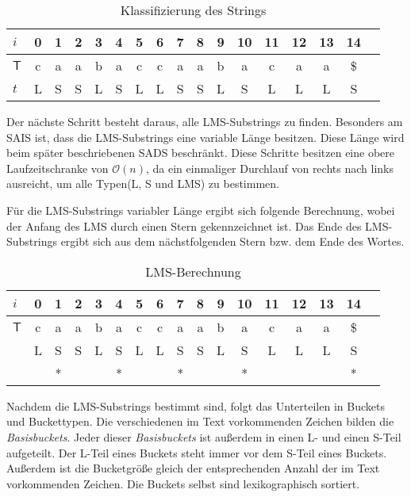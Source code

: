 \begin{table}[H]
\centering
  \begin{tabular}{ | l | c | c | c | c | c | c | c | c | c | c | c | c | c | c | c | c | }
    \hline
        $i$ & 0 & 1 & 2 & 3 & 4 & 5 & 6 & 7 & 8 & 9 & 10 & 11 & 12 & 13 & 14 \\ \hline
        $\mathsf{T}$ & c & a & a & b & a & c & c & a & a & b & a & c & a & a & \$ \\ \hline
        $t$ & L & S & S & L & S & L & L & S & S & L & S & L & L & L & S \\
    \hline
  \end{tabular}
  \caption{Klassifizierung des Strings }
\end{table}
\bigskip
\noindent Der nächste Schritt besteht daraus, alle LMS-Substrings zu finden. Besonders am SAIS ist, dass die LMS-Substrings eine variable Länge besitzen. Diese Länge wird beim später beschriebenen SADS beschränkt. Diese Schritte besitzen eine obere Laufzeitschranke von $\mathcal{O}(n)$, da ein einmaliger Durchlauf von rechts nach links ausreicht, um alle Typen(L, S und LMS) zu bestimmen.

\noindent Für die LMS-Substrings variabler Länge ergibt sich folgende Berechnung, wobei der Anfang des LMS durch einen Stern gekennzeichnet ist. Das Ende des LMS-Substrings ergibt sich aus dem nächstfolgenden Stern bzw. dem Ende des Wortes.

\begin{table}[H]
\centering
  \begin{tabular}{ | l | c | c | c | c | c | c | c | c | c | c | c | c | c | c | c | c | }
    \hline
        $i$ & 0 & 1 & 2 & 3 & 4 & 5 & 6 & 7 & 8 & 9 & 10 & 11 & 12 & 13 & 14 \\ \hline
        $\mathsf{T}$ & c & a & a & b & a & c & c & a & a & b & a & c & a & a & \$ \\ \hline
            & L & S & S & L & S & L & L & S & S & L & S & L & L & L & S \\ \hline
            &   & * &   &   & * &   &   & * &   &   & * &   &   &   & * \\
    \hline
  \end{tabular}
  \caption{LMS-Berechnung}
\end{table}
\bigskip
\noindent Nachdem die LMS-Substrings bestimmt sind, folgt das Unterteilen in Buckets und Buckettypen. Die verschiedenen im Text vorkommenden Zeichen bilden die  \textit{Basisbuckets}. Jeder dieser  \textit{Basisbuckets} ist außerdem in einen L- und einen S-Teil aufgeteilt. Der L-Teil eines Buckets steht immer vor dem S-Teil eines Buckets. Außerdem ist die Bucketgröße gleich der entsprechenden Anzahl der im Text vorkommenden Zeichen. Die Buckets selbst sind lexikographisch sortiert.


